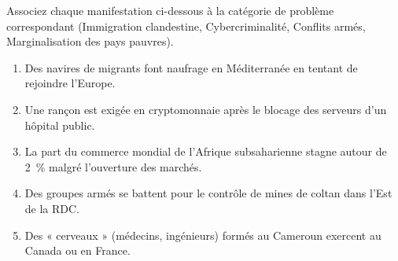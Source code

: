 \documentclass[11pt]{article}
\begin{document}
\begin{exercice}
Associez chaque manifestation ci-dessous à la catégorie de problème correspondant (Immigration clandestine, Cybercriminalité, Conflits armés, Marginalisation des pays pauvres).
\begin{enumerate}
    \item Des navires de migrants font naufrage en Méditerranée en tentant de rejoindre l'Europe.
    \item Une rançon est exigée en cryptomonnaie après le blocage des serveurs d'un hôpital public.
    \item La part du commerce mondial de l'Afrique subsaharienne stagne autour de 2~\% malgré l'ouverture des marchés.
    \item Des groupes armés se battent pour le contrôle de mines de coltan dans l'Est de la RDC.
    \item Des « cerveaux » (médecins, ingénieurs) formés au Cameroun exercent au Canada ou en France.
\end{enumerate}
\end{exercice}
\end{document}
